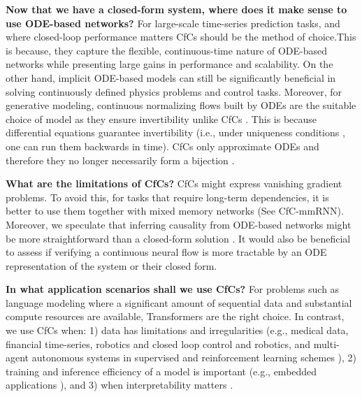 \documentclass[12pt]{article}
\begin{document}
\noindent \textbf{Now that we have a closed-form system, where does it make sense to use ODE-based networks?} For large-scale time-series prediction tasks, and where closed-loop performance matters \cite{vorbach2021causal} CfCs should be the method of choice.This is because, they capture the flexible, continuous-time nature of ODE-based networks while presenting large gains in performance and scalability. On the other hand, implicit ODE-based models can still be significantly beneficial in solving continuously defined physics problems and control tasks. Moreover, for generative modeling, continuous normalizing flows built by ODEs are the suitable choice of model as they ensure invertibility unlike CfCs \cite{chen2018neural}. This is because differential equations guarantee invertibility (i.e., under uniqueness conditions \cite{liebenwein2021sparse}, one can run them backwards in time). CfCs only approximate ODEs and therefore they no longer necessarily form a bijection \cite{rezende2015variational}. 

\noindent \textbf{What are the limitations of CfCs?} CfCs might express vanishing gradient problems. To avoid this, for tasks that require long-term dependencies, it is better to use them together with mixed memory networks \cite{lechner2020learning} (See CfC-mmRNN). Moreover, we speculate that inferring causality from ODE-based networks might be more straightforward than a closed-form solution \cite{vorbach2021causal}. It would also be beneficial to assess if verifying a continuous neural flow \cite{Grunbacher2021verification} is more tractable by an ODE representation of the system or their closed form. 

\noindent \textbf{In what application scenarios shall we use CfCs?} For problems such as language modeling where a significant amount of sequential data and substantial compute resources are available, Transformers \cite{vaswani2017attention} are the right choice. In contrast, we use CfCs when: 1) data has limitations and irregularities (e.g., medical data, financial time-series, robotics \cite{lechner2021adversarial} and closed loop control and robotics, and multi-agent autonomous systems in supervised and reinforcement learning schemes \cite{brunnbauer2021model}), 2) training and inference efficiency of a model is important (e.g., embedded applications \cite{hasani2016efficient,wang2019generative,delpreto2020plug}), and 3) when interpretability matters \cite{hasani2020interpretable}. 
\end{document}

